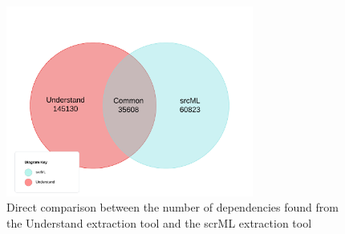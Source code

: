 \documentclass[12pt, dvipsnames, a4paper]{article}
\begin{document}
\begin{figure}[H]
	\center
	\includegraphics[width = 230pt]{assets/UnderstandSrcML.jpeg}
	\caption{Direct comparison between the number of dependencies found from the Understand extraction tool and the scrML extraction tool}
\end{figure}
\end{document}
